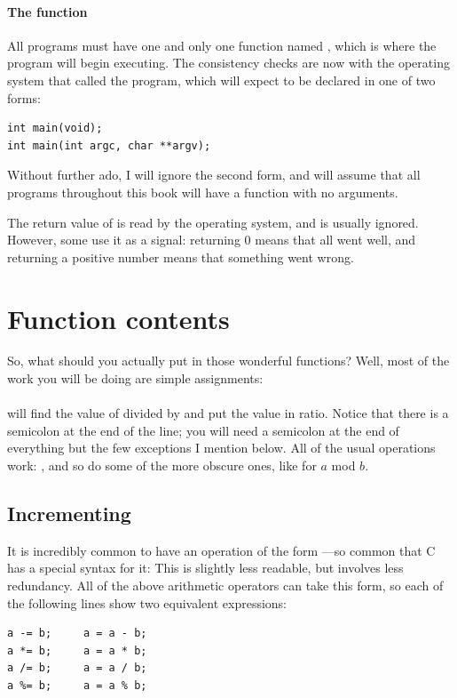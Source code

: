 \documentclass[12pt]{article}
\makeatletter
\def\ttindex#1{\index{#1@\cinline{#1}}}
\makeatother
\begin{document}
\paragraph{The  function}\ttindex{main}

All programs must have one and only one function named ,
which is where the program will begin executing. The consistency checks
are now with the operating system that called the program, which will
expect  to be declared in one of two forms:

\begin{lstlisting}
int main(void);
int main(int argc, char **argv);
\end{lstlisting}

Without further ado, I will ignore the second form, and will assume that all programs throughout this
book will have a  function with no arguments.

The return value of  is read by the operating system, and is usually ignored. However, some
use it as a signal:  returning 0 means that all went well, and returning a positive number means that
something went wrong.



\section{Function contents} \label{fncontents}

So, what should you actually put in those wonderful functions? Well, most of the work you will be doing are
simple assignments:    \index{=}\\
\\
will find the value of  divided by  and put the value in ratio. Notice that there is a
semicolon at the end of the line; you will need a semicolon at the end of everything but the few
exceptions I mention below. All of the usual operations work: \cinline{+ - / *}, and so do some of the more
obscure ones, like  for $a$ mod $b$.  \index{\%}

\subsection{Incrementing} It is incredibly common to have an operation of the form ---so
common that C has a special syntax for it:  This is slightly less readable, but involves less
redundancy. All of the above arithmetic operators can take this form, so each of the following lines show two
equivalent expressions: \\
\begin{lstlisting}
a -= b;     a = a - b;
a *= b;     a = a * b;
a /= b;     a = a / b;
a %= b;     a = a % b;
\end{lstlisting}
\end{document}
